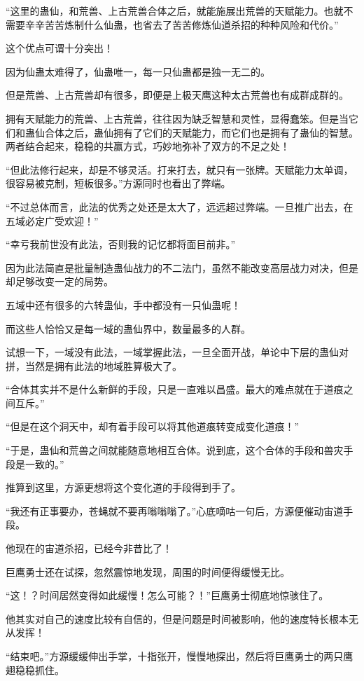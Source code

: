 \begin{this_body}
“这里的蛊仙，和荒兽、上古荒兽合体之后，就能施展出荒兽的天赋能力。也就不需要辛辛苦苦炼制什么仙蛊，也省去了苦苦修炼仙道杀招的种种风险和代价。”

这个优点可谓十分突出！

因为仙蛊太难得了，仙蛊唯一，每一只仙蛊都是独一无二的。

但是荒兽、上古荒兽却有很多，即便是上极天鹰这种太古荒兽也有成群成群的。

拥有天赋能力的荒兽、上古荒兽，往往因为缺乏智慧和灵性，显得蠢笨。但是当它们和蛊仙合体之后，蛊仙拥有了它们的天赋能力，而它们也是拥有了蛊仙的智慧。两者结合起来，稳稳的共赢方式，巧妙地弥补了双方的不足之处！

“但此法修行起来，却是不够灵活。打来打去，就只有一张牌。天赋能力太单调，很容易被克制，短板很多。”方源同时也看出了弊端。

“不过总体而言，此法的优秀之处还是太大了，远远超过弊端。一旦推广出去，在五域必定广受欢迎！”

“幸亏我前世没有此法，否则我的记忆都将面目前非。”

因为此法简直是批量制造蛊仙战力的不二法门，虽然不能改变高层战力对决，但是却足够改变一定的局势。

五域中还有很多的六转蛊仙，手中都没有一只仙蛊呢！

而这些人恰恰又是每一域的蛊仙界中，数量最多的人群。

试想一下，一域没有此法，一域掌握此法，一旦全面开战，单论中下层的蛊仙对拼，当然是拥有此法的地域胜算极大了。

“合体其实并不是什么新鲜的手段，只是一直难以昌盛。最大的难点就在于道痕之间互斥。”

“但是在这个洞天中，却有着手段可以将其他道痕转变成变化道痕！”

“于是，蛊仙和荒兽之间就能随意地相互合体。说到底，这个合体的手段和兽灾手段是一致的。”

推算到这里，方源更想将这个变化道的手段得到手了。

“我还有正事要办，苍蝇就不要再嗡嗡嗡了。”心底嘀咕一句后，方源便催动宙道手段。

他现在的宙道杀招，已经今非昔比了！

巨鹰勇士还在试探，忽然震惊地发现，周围的时间便得缓慢无比。

“这！？时间居然变得如此缓慢！怎么可能？！”巨鹰勇士彻底地惊骇住了。

他其实对自己的速度比较有自信的，但是问题是时间被影响，他的速度特长根本无从发挥！

“结束吧。”方源缓缓伸出手掌，十指张开，慢慢地探出，然后将巨鹰勇士的两只鹰翅稳稳抓住。


\end{this_body}
